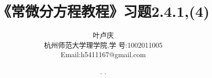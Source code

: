 \documentclass[a4paper, 12pt]{article} %
\makeatletter
\renewcommand{\maketitle}{ %
  \renewcommand\refname{参考文献}
  \newcommand{\D}{\displaystyle}\newcommand{\ri}{\Rightarrow}
  \newcommand{\ds}{\displaystyle} \renewcommand{\ni}{\noindent}
  \newcommand{\pa}{\partial} \newcommand{\Om}{\Omega}
  \newcommand{\om}{\omega} \newcommand{\sik}{\sum_{i=1}^k}
  \newcommand{\vov}{\Vert\omega\Vert} \newcommand{\Umy}{U_{\mu_i,y^i}}
  \newcommand{\lamns}{\lambda_n^{^{\scriptstyle\sigma}}}
  \newcommand{\chiomn}{\chi_{_{\Omega_n}}}
  \newcommand{\ullim}{\underline{\lim}} \newcommand{\bsy}{\boldsymbol}
  \newcommand{\mvb}{\mathversion{bold}} \newcommand{\la}{\lambda}
  \newcommand{\La}{\Lambda} \newcommand{\va}{\varepsilon}
  \newcommand{\be}{\beta} \newcommand{\al}{\alpha}
  \newcommand{\dis}{\displaystyle} \newcommand{\R}{{\mathbb R}}
  \newcommand{\N}{{\mathbb N}} \newcommand{\cF}{{\mathcal F}}
  \newcommand{\gB}{{\mathfrak B}} \newcommand{\eps}{\epsilon}
  \begin{flushright} %
    {\LARGE\@title} %
    
    \vspace{50pt} %
    
    {\large\@author} %
    \\\@date %
    
    \vspace{40pt} %
  \end{flushright}
}
\makeatother
\begin{document}
\begin{CJK}{UTF8}{gkai}
  \title{\textbf{《常微分方程教程》\cite{dinglichang}习题2.4.1,(4)}}
  \author{\small{叶卢庆}\\{\small{杭州师范大学理学院,学
        号:1002011005}}\\{\small{Email:h5411167@gmail.com}}} %
  \renewcommand{\today}{\number\year. \number\month. \number\day}
  \date{\today} %
  
  
  
  \maketitle %
  
  
  
  
  
  
  

\end{CJK}
\end{document}
